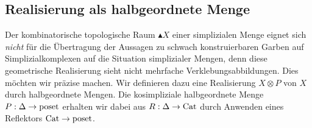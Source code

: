 \subsection{Realisierung als halbgeordnete Menge}
\label{sec:real-poset}

Der kombinatorische topologische Raum $\blacktriangle X$ einer
simplizialen Menge eignet sich \emph{nicht} für die Übertragung der
Aussagen zu schwach konstruierbaren Garben auf Simplizialkomplexen auf
die Situation simplizialer Mengen, denn diese geometrische
Realisierung sieht nicht mehrfache Verklebungsabbildungen. Dies
möchten wir präzise machen. Wir definieren dazu eine Realisierung $X
\otimes P$ von $X$ durch halbgeordnete Mengen. Die kosimpliziale
halbgeordnete Menge $P: \Delta \to \operatorname{poset}$ erhalten wir dabei aus $R:
\Delta \to \operatorname{Cat}$ durch Anwenden eines Reflektors $\operatorname{Cat} \to \operatorname{poset}$.

